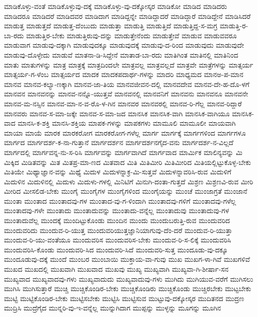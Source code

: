 {ಮಾಡಿಕೊಳ್ಳು-ವಂತೆ
ಮಾಡಿಕೊಳ್ಳುವು-ದಕ್ಕೆ
ಮಾಡಿಕೊಳ್ಳು-ವು-ದಕ್ಕೋಸ್ಕರ
ಮಾಡಿಕೋ
ಮಾಡಿದ
ಮಾಡಿದರು
ಮಾಡಿದರೂ
ಮಾಡಿದರೆ
ಮಾಡಿದವರ
ಮಾಡಿದಾಗ
ಮಾಡಿದ್ದನ್ನೇ
ಮಾಡಿದ್ದಾದರೆ
ಮಾಡಿದ್ದಾರೆ
ಮಾಡಿದ್ದೇನೆ
ಮಾಡಿಸಿದರೆ
ಮಾಡುತ್ತ
ಮಾಡುತ್ತದೆ
ಮಾಡುತ್ತ-ದೆಂಬುದು
ಮಾಡುತ್ತಾ
ಮಾಡುತ್ತಿ
ಮಾಡುತ್ತಿದೆ
ಮಾಡುತ್ತಿದ್ದ-ಸ-ಮಗ್ರ
ಮಾಡುತ್ತಿ-ರ-ಬಾ-ರದು
ಮಾಡುತ್ತಿರ-ಬೇಕು
ಮಾಡುತ್ತಿರುವು-ದನ್ನು
ಮಾಡುತ್ತೇನೆಂದು
ಮಾಡುತ್ತೇವೆ
ಮಾಡುವ
ಮಾಡುವವರೂ
ಮಾಡುವಾಗ
ಮಾಡುವು-ದಕ್ಕಾಗಿ
ಮಾಡುವುದಕ್ಕೂ
ಮಾಡುವುದಕ್ಕೆ
ಮಾಡುವು-ದ-ರಿಂದ
ಮಾಡುವುದು
ಮಾಡುವುದೇ
ಮಾಡುವು-ದೊಳ್ಳೇದು
ಮಾಡುವೆ
ಮಾತನಾ-ಡಿ-ಸಿದ್ದೇನೆ
ಮಾತಾಡ-ಬಾ-ರದು
ಮಾತಿಗಿಂತ
ಮಾತಿನಲ್ಲಿ
ಮಾತಿನಿಂದ
ಮಾತು
ಮಾತುಗಳನ್ನು
ಮಾತ್ರ
ಮಾತ್ರಕ್ಕೆ
ಮಾತ್ರದಿಂದಲೇ
ಮಾತ್ರವಲ್ಲ
ಮಾತ್ರವಲ್ಲದೆ
ಮಾತ್ರವೇ
ಮಾತ್ರೆಗಳನ್ನು
ಮಾತ್ಸರ್ಯ
ಮಾತ್ಸರ್ಯ-ಗ-ಳೆಂಬ
ಮಾತ್ಸರ್ಯದ
ಮಾದಕ
ಮಾದಕಪದಾರ್ಥ-ಗಳನ್ನು
ಮಾದರಿ
ಮಾಧ್ಯಮದ
ಮಾನಅ-ಪ-ಮಾನ
ಮಾನವ
ಮಾನವ-ಕಲ್ಯಾ-ಣಕ್ಕಾಗಿ
ಮಾನವ-ಜಾ-ತಿಯ
ಮಾನವಜೀವನ-ದಲ್ಲಿ
ಮಾನವದೇವ
ಮಾನವ-ದೇ-ಹ-ದೊ-ಳಗೆ
ಮಾನವನ
ಮಾನವನನ್ನು
ಮಾನವ-ನನ್ನೊ-ಯುತ್ತವೆ
ಮಾನವನಲ್ಲಿ
ಮಾನವನಿಗೆ
ಮಾನವನು
ಮಾನವನೂ
ಮಾನವನೇ
ಮಾನವ-ಮ-ನಸ್ಸಿನ
ಮಾನವ-ಮಾ-ನ-ವ-ರೊ-ಳ-ಗಿನ
ಮಾನವರ
ಮಾನವರಲ್ಲಿ
ಮಾನವ-ರಿ-ಗೆಲ್ಲ
ಮಾನವ-ರಿದ್ದಾರೆ
ಮಾನವರು
ಮಾನವ-ಸ-ಮಾ-ಜಕ್ಕೇ
ಮಾನವ-ಸ-ಮಾ-ಜದ
ಮಾನಸಿಕ
ಮಾನಸಿಕ-ವಾಗಿ
ಮಾನಸಿಕ-ವಾಗಿಯೂ
ಮಾನಸಿಕ-ವಾದ
ಮಾನಸಿ-ಕ-ಶಕ್ತಿ
ಮಾನಸಿ-ಶಕ್ತಿಯ
ಮಾಪಕ-ಗಳನ್ನು
ಮಾಪಕಗಳು
ಮಾಮೂಲಿ
ಮಾಮೂಲೀ
ಮಾಯವಾಗಿ
ಮಾಯಾ
ಮಾಯೆ
ಮಾರಕ
ಮಾರಕರೋಗ
ಮಾರಕರೋಗ-ಗಳೆಲ್ಲ
ಮಾರ್ಗ
ಮಾರ್ಗಕ್ಕೆ
ಮಾರ್ಗಗಳಿಂದ
ಮಾರ್ಗಗಳೂ
ಮಾರ್ಗದ
ಮಾರ್ಗದರ್ಶ-ಕ-ನಾ-ಗುತ್ತಾನೆ
ಮಾರ್ಗದರ್ಶನ
ಮಾರ್ಗದರ್ಶನಗೈದ-ವನು
ಮಾರ್ಗದರ್ಶ-ನ-ವಿಲ್ಲದೆ
ಮಾರ್ಗದಲ್ಲಿ
ಮಾರ್ಗವನ್ನ-ನು-ಸ-ರಿಸಿ
ಮಾರ್ಗವನ್ನು
ಮಾರ್ಗವಾಗಿದೆ
ಮಾರ್ಗವಾದ
ಮಾರ್ಮಿಕ
ಮಾಲಿನ್ಯವನ್ನು
ಮಿ
ಮಿಕ್ಕಿದ
ಮಿಡಿತವನ್ನು
ಮಿತ
ಮಿತಪ್ರ-ಮಾ-ಣದ
ಮಿತವಾದ
ಮಿತಿ
ಮಿತಿಮೀರಿ
ಮಿತಿಮೀರಿದ
ಮಿತಿಯಲ್ಲಿಟ್ಟುಕೊಳ್ಳ-ಬೇಕು
ಮಿತಿಯೇ
ಮಿಥ್ಯಾಜ್ಞಾನ-ವನ್ನು
ಮಿಥ್ಯೆ
ಮಿದುಳ
ಮಿದುಳನ್ನಾಕ್ರ-ಮಿ-ಸುತ್ತವೆ
ಮಿದುಳನ್ನಾವರಿಸಿ-ರುವ
ಮಿದುಳಿಗೆ
ಮಿದುಳಿನ
ಮಿದುಳಿನಲ್ಲಿ
ಮಿದುಳು
ಮಿದುಳು-ಗಳಲ್ಲಿ
ಮಿನಿಟಿಗೆ
ಮಿನುಗಿ-ದಂತಾ-ಗುತ್ತದೆ
ಮಿಶ್ರಣ
ಮಿಶ್ರಣವಿ-ರುವ
ಮೀರಿ
ಮೀರಿದ
ಮೀಸಲಿಡ-ಬೇಕು
ಮುಂಗೈ
ಮುಂಗೈಗಳ
ಮುಂಗೈಗಳಿಂದ
ಮುಂಗೈಯನ್ನು
ಮುಂಚೆ
ಮುಂಜಾಗ್ರತೆ
ಮುಂಜಾನೆ
ಮುಂತಾ
ಮುಂತಾದ
ಮುಂತಾದವು-ಗಳ
ಮುಂತಾದ-ವು-ಗ-ಳಿಂದಾಗಿ
ಮುಂತಾದವು-ಗಳಿಗೆ
ಮುಂತಾದವು-ಗಳೆಲ್ಲ
ಮುಂತಾದವು-ಗಳೇ
ಮುಂತಾದು
ಮುಂತಾದುವನ್ನು
ಮುಂತಾದು-ವನ್ನೆಲ್ಲ
ಮುಂತಾದುವು
ಮುಂತಾದುವು-ಗಳ
ಮುಂತಾದುವೆಲ್ಲ
ಮುಂದಕ್ಕೆ
ಮುಂದಿಟ್ಟುಕೊಂಡು
ಮುಂದಿನ
ಮುಂದು
ಮುಂದುಬರುತ್ತಿ-ರುವ
ಮುಂದುವರಿದ
ಮುಂದುವರಿದು
ಮುಂದುವ-ರಿ-ಯುತ್ತ
ಮುಂದುವರಿಯುತ್ತಜ್ಞಾನಿಯಾಗುವು-ದೆಂ-ದರೆ
ಮುಂದುವ-ರಿ-ಯುತ್ತಾ
ಮುಂದುವ-ರಿ-ಯು-ವಂತೆಯೂ
ಮುಂದುವರಿಸ
ಮುಂದುವರಿಸ-ಬೇಕು
ಮುಂದುವ-ರಿ-ಸ-ಲಿಕ್ಕೆ
ಮುಂದುವರಿಸಿ
ಮುಂದುವರಿಸಿ-ಕೊಂಡು
ಮುಂದುವರಿ-ಸಿದ
ಮುಂದುವರಿ-ಸಿದೆ
ಮುಂದುವರಿ-ಸುತ್ತ
ಮುಂದೂಡು-ವು-ದಕ್ಕೂ
ಮುಂದೂಡುವು-ದಕ್ಕೆ
ಮುಂದೆ
ಮುಂಬರ
ಮುಂಬಾಯಿ
ಮುಕ್ತಾಯ-ವಾ-ಗುವು
ಮುಖ
ಮುಖಗ-ಳಾ-ಗಿವೆ
ಮುಖಗಳಿವೆ
ಮುಖದ
ಮುಖದಲ್ಲಿ
ಮುಖವಾಗಿ
ಮುಖವಾದ
ಮುಖವು
ಮುಖ್ಯ
ಮುಖ್ಯವಾಗಿ
ಮುಖ್ಯವಾ-ಗಿ-ಶೀರ್ಷಾ-ಸನ
ಮುಖ್ಯವಾದ
ಮುಖ್ಯವಾದವು-ಗಳು
ಮುಖ್ಯವಾದುದು
ಮುಖ್ಯವಾದುವು-ಗಳು
ಮುಗಿದು
ಮುಗಿಯುವ-ವರೆಗೆ
ಮುಗಿಸಲು
ಮುಗಿಸಿ
ಮುಗಿಸುತ್ತಾರೆ
ಮುಚ್ಚಿ
ಮುಚ್ಚಿಕೊಂಡಿರ-ಬೇಕು
ಮುಚ್ಚಿಕೊಂಡಿರು
ಮುಚ್ಚಿಕೊಂಡು
ಮುಚ್ಚಿರಬೇಕು
ಮುಟ್ಟಬೇಕು
ಮುಟ್ಟಿ
ಮುಟ್ಟಿಕೊಂಡಿರ-ಬೇಕು
ಮುಟ್ಟಿಸಬೇಕು
ಮುಟ್ಟಿಸಿ
ಮುಟ್ಟಿಸುವ
ಮುಟ್ಟುವು-ದಕ್ಕೋಸ್ಕರ
ಮುದಿತನದ
ಮುದ್ರಣ
ಮುದ್ರಿಸಿ
ಮುದ್ರೆಗೈದ
ಮುನ್ನರಿ-ವು-ಇ-ವನ್ನೆಲ್ಲ
ಮುನ್ನುಗಿದಾಗ
ಮುಪ್ಪನ್ನು
ಮುಳ್ಳನ್ನು
ಮೂಗನ್ನು
ಮೂಗಿನ
}
